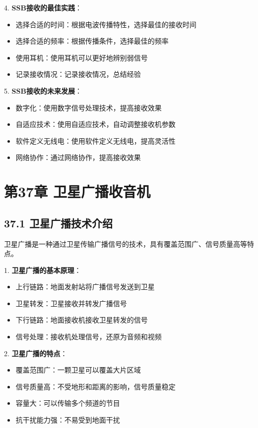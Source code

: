 \documentclass[12pt,UTF8]{ctexbook}
\begin{document}
4. \textbf{SSB接收的最佳实践}：
   \begin{itemize}[leftmargin=3.5em]
   \item 选择合适的时间：根据电波传播特性，选择最佳的接收时间
   \item 选择合适的频率：根据传播条件，选择最佳的频率
   \item 使用耳机：使用耳机可以更好地辨别弱信号
   \item 记录接收情况：记录接收情况，总结经验
   \end{itemize}

5. \textbf{SSB接收的未来发展}：
   \begin{itemize}[leftmargin=3.5em]
   \item 数字化：使用数字信号处理技术，提高接收效果
   \item 自适应技术：使用自适应技术，自动调整接收机参数
   \item 软件定义无线电：使用软件定义无线电，提高灵活性
   \item 网络协作：通过网络协作，提高接收效果
   \end{itemize}

\chapter*{第37章 卫星广播收音机}
\section*{37.1 卫星广播技术介绍}

卫星广播是一种通过卫星传输广播信号的技术，具有覆盖范围广、信号质量高等特点。

1. \textbf{卫星广播的基本原理}：
   \begin{itemize}[leftmargin=3.5em]
   \item 上行链路：地面发射站将广播信号发送到卫星
   \item 卫星转发：卫星接收并转发广播信号
   \item 下行链路：地面接收机接收卫星转发的信号
   \item 信号处理：接收机处理信号，还原为音频和视频
   \end{itemize}

2. \textbf{卫星广播的特点}：
   \begin{itemize}[leftmargin=3.5em]
   \item 覆盖范围广：一颗卫星可以覆盖大片区域
   \item 信号质量高：不受地形和距离的影响，信号质量稳定
   \item 容量大：可以传输多个频道的节目
   \item 抗干扰能力强：不易受到地面干扰
   \end{itemize}
\end{document}
